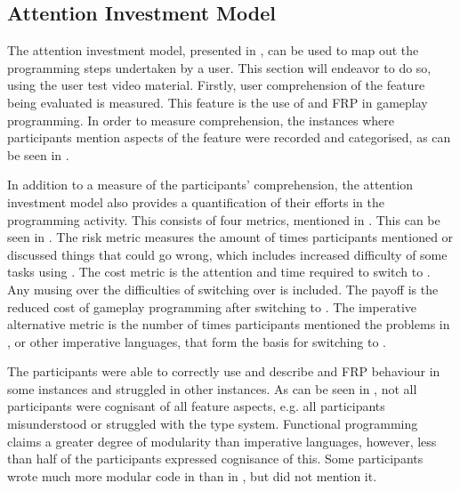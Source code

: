 \subsection{Attention Investment Model}\label{sec:att-inv-app}
The attention investment model, presented in , can be used to map out the programming steps undertaken by a user. This section will endeavor to do so, using the user test video material. Firstly, user comprehension of the feature being evaluated is measured. This feature is the use of \fsh and \gls{FRP} in gameplay programming. In order to measure comprehension, the instances where participants mention aspects of the feature were recorded and categorised, as can be seen in .


In addition to a measure of the participants' comprehension, the attention investment model also provides a quantification of their efforts in the programming activity. This consists of four metrics, mentioned in . This can be seen in . The risk metric measures the amount of times participants mentioned or discussed things that could go wrong, which includes increased difficulty of some tasks using \fsh. The cost metric is the attention and time required to switch to \fsh. Any musing over the difficulties of switching over is included. The payoff is the reduced cost of gameplay programming after switching to \fsh. The imperative alternative metric is the number of times participants mentioned the problems in \csh, or other imperative languages, that form the basis for switching to \fsh.


The participants were able to correctly use and describe \fsh and \gls{FRP} behaviour in some instances and struggled in other instances. As can be seen in , not all participants were cognisant of all feature aspects, e.g. all participants misunderstood or struggled with the type system. Functional programming claims a greater degree of modularity than imperative languages\cite{hughes1989functional}, however, less than half of the participants expressed cognisance of this. Some participants wrote much more modular code in \fsh than in \csh, but did not mention it.

